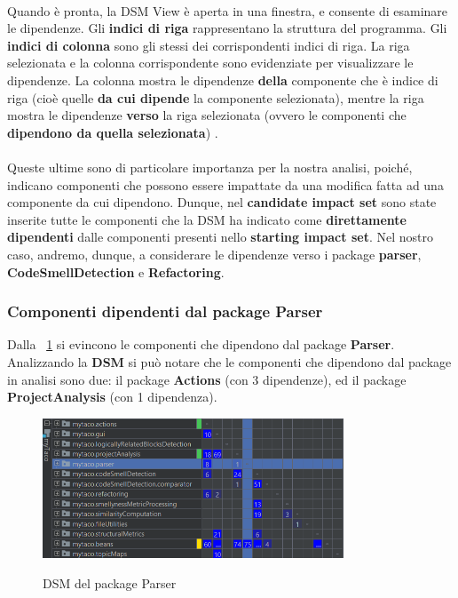 	\paragraph{} Quando è pronta, la DSM View è aperta in una finestra, e consente di esaminare le dipendenze. Gli \textbf{indici di riga} rappresentano la struttura del programma. Gli \textbf{indici di colonna} sono gli stessi dei corrispondenti indici di riga. La riga selezionata e la colonna corrispondente sono evidenziate per visualizzare le dipendenze. La colonna mostra le dipendenze \textbf{della} componente che è indice di riga (cioè quelle \textbf{da cui dipende} la componente selezionata), mentre la riga mostra le dipendenze \textbf{verso} la riga selezionata (ovvero le componenti che \textbf{dipendono da quella selezionata}) \cite{dsm}. 
	
	\paragraph{}
	Queste ultime sono di particolare importanza per la nostra analisi, poiché, indicano componenti che possono essere impattate da una modifica fatta ad una componente da cui dipendono. Dunque, nel \textbf{candidate impact set} sono state inserite tutte le componenti che la DSM ha indicato come \textbf{direttamente dipendenti} dalle componenti presenti nello \textbf{starting impact set}. Nel nostro caso, andremo, dunque, a considerare le dipendenze verso i package \textbf{parser}, \textbf{CodeSmellDetection} e \textbf{Refactoring}.
	
	\subsubsection{Componenti dipendenti dal package Parser}

	Dalla \figurename~\ref{dsm1} si evincono le componenti che dipendono dal package \textbf{Parser}. Analizzando la \textbf{DSM} si può notare che le componenti che dipendono dal package in analisi sono due: il package \textbf{Actions} (con 3 dipendenze), ed il package \textbf{ProjectAnalysis} (con 1 dipendenza).
	
	\begin{figure}[h!]
		\centering
		\includegraphics[width=0.8\textwidth]{dsm2.png}\\[1cm]
		\caption{DSM del package Parser}
		\label{dsm1}
	\end{figure}


